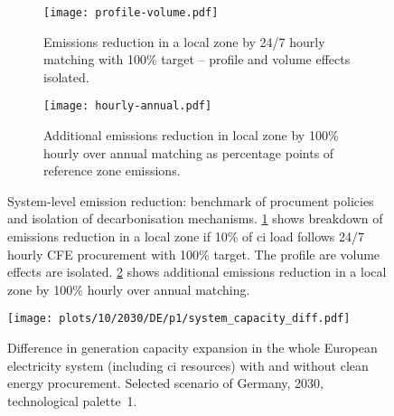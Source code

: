 \begin{figure}
    \centering
    \begin{subfigure}[t]{0.95\columnwidth}
        \centering
        \caption{Emissions reduction in a local zone by 24/7 hourly matching with 100\% target -- profile and volume effects isolated.}
        \texttt{[image: profile-volume.pdf]}
        \label{fig:10-profile-volume.pdf}
    \end{subfigure}
    \begin{subfigure}[t]{0.95\columnwidth}
        \centering
        \caption{Additional emissions reduction in local zone by 100\% hourly over annual matching as percentage points of reference zone emissions.}
        \texttt{[image: hourly-annual.pdf]}
        \label{fig:10-hourly-annual.pdf}
    \end{subfigure}
    \caption{
        System-level emission reduction: benchmark of procument policies and isolation of decarbonisation mechanisms. 
    \cref{fig:10-profile-volume.pdf} shows breakdown of emissions reduction in a local zone if 10\% of \gls{ci} load follows 24/7 hourly CFE procurement with 100\% target. The profile are volume effects are isolated.
    \cref{fig:10-hourly-annual.pdf} shows additional emissions reduction in a local zone by 100\% hourly over annual matching.}
    \label{fig:decarbonisation_story}
\end{figure}

\begin{figure}
    \centering
    \texttt{[image: plots/10/2030/DE/p1/system\_capacity\_diff.pdf]}
    \caption{
    Difference in generation capacity expansion in the whole European electricity system (including \gls{ci} resources) with and without clean energy procurement. 
    Selected scenario of Germany, 2030, technological palette~1.}
    \label{fig:10-2030-DE-p1-system_capacity_diff.pdf}
\end{figure}
